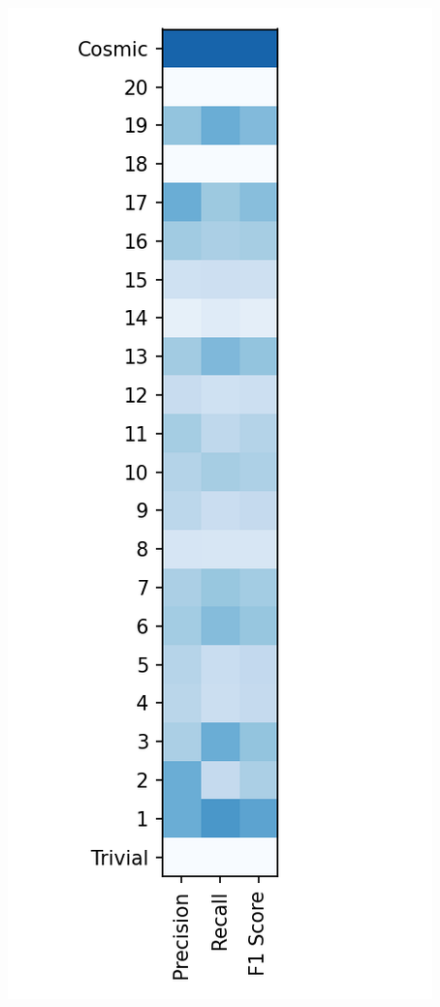 \documentclass{article}
\begin{document}
\begin{figure}[ht]
		\begin{minipage}[b]{0.32\linewidth}
			\centering
			\includegraphics[width=\linewidth]{22 - K Nearest Neighbors.png} 

\end{minipage}
\end{figure}
\end{document}
